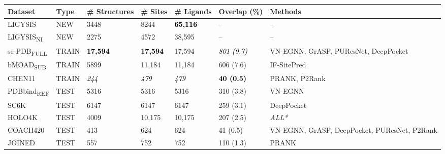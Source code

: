 \begin{landscape}
\begin{longtable}{|M{24mm}|M{20mm}|M{27mm}|M{20mm}|M{25mm}|M{25mm}|M{58mm}|}
\hline
\textbf{Dataset}    & \textbf{Type}  & \textbf{\# Structures} & \textbf{\# Sites} & \textbf{\# Ligands} & \textbf{Overlap} (\%) & \textbf{Methods}                                      \\ \hline
\endfirsthead
%
\endhead
%
LIGYSIS    & NEW   & 3448         & 8244    & \textbf{\textcolor{black}{65,116}}     & --          & --                                            \\ \hline
LIGYSIS\textsubscript{NI}  & NEW   & 2275         & 4572    & 38,595     & --          & --                                            \\ \hline
sc-PDB\textsubscript{FULL} & TRAIN & \textbf{\textcolor{black}{17,594}}        & \textbf{\textcolor{black}{17,594}}   & 17,594     & \textit{\textcolor{black}{801 (9.7)}}        & VN-EGNN, GrASP, PUResNet, DeepPocket         \\ \hline
bMOAD\textsubscript{SUB}   & TRAIN & 5899         & 11,184   & 11,184     & 606 (7.6)        & IF-SitePred                                  \\ \hline
CHEN11     & TRAIN & \textit{\textcolor{black}{244}}           & \textit{\textcolor{black}{479}}      & \textit{\textcolor{black}{479}}        & \textbf{\textcolor{black}{40 (0.5)}}        & PRANK, P2Rank                                       \\ \hline
PDBbind\textsubscript{REF} & TEST  & 5316         & 5316    & 5316      & 310 (3.8)        & VN-EGNN                                      \\ \hline
SC6K       & TEST  & 6147         & 6147    & 6147      & 259 (3.1)        & DeepPocket                                   \\ \hline
HOLO4K     & TEST  & 4009         & 10,175   & 10,175     & 207 (2.5)        & \textit{ALL*}                                         \\ \hline
COACH420   & TEST  & 413           & 624      & 624        & 41 (0.5)        & VN-EGNN, GrASP, DeepPocket, PUResNet, P2Rank \\ \hline
JOINED   & TEST  & 557           & 752      & 752        & 110 (1.3)        & PRANK \\ \hline

\end{longtable}
\end{landscape}
